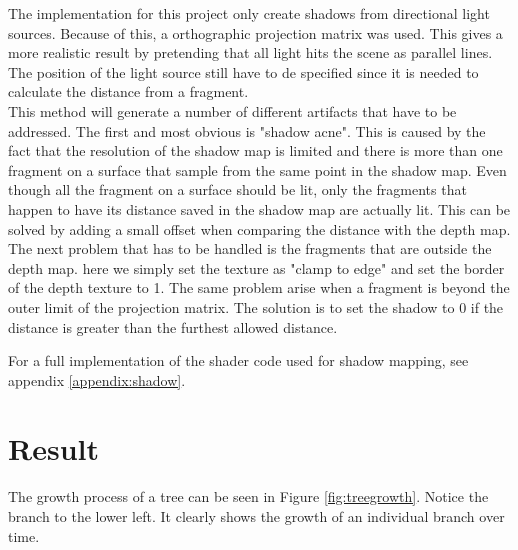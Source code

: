 \documentclass{article}
\begin{document}
  				The implementation for this project only create shadows from directional light sources. Because of this, a orthographic projection matrix was used. This gives a more realistic result by pretending that all light hits the scene as parallel lines. The position of the light source still have to de specified since it is needed to calculate the distance from a fragment. \\
  				
  				This method will generate a number of different artifacts that have to be addressed. The first and most obvious is "shadow acne". This is caused by the fact that the resolution of the shadow map is limited and there is more than one fragment on a surface that sample from the same point in the shadow map. Even though all the fragment on a surface should be lit, only the fragments that happen to have its distance saved in the shadow map are actually lit. This can be solved by adding a small offset when comparing the distance with the depth map. \\
  				
  				The next problem that has to be handled is the fragments that are outside the depth map. here we simply set the texture as "clamp to edge" and set the border of the depth texture to 1. The same problem arise when a fragment is beyond the outer limit of the projection matrix. The solution is to set the shadow to 0 if the distance is greater than the furthest allowed distance.
  				
  				For a full implementation of the shader code used for shadow mapping, see appendix \ref{appendix:shadow}.
  				
  	\section{Result}
  		
  		The growth process of a tree can be seen in Figure \ref{fig:treegrowth}. Notice the branch to the lower left. It clearly shows the growth of an individual branch over time. 
  		
\end{document}
